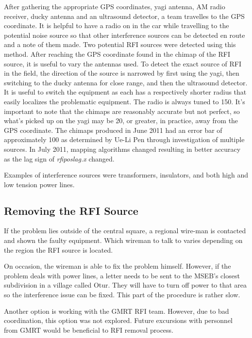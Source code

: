 \documentclass[a4paper,12pt]{article}
\begin{document}
      After gathering the appropriate GPS coordinates, yagi antenna, AM radio receiver, ducky antenna and an ultrasound detector, a  team travelles to the GPS coordinate. It is helpful to have a radio on in the car while travelling to the potential noise source so that other interference sources can be detected en route and a note of them made. Two potential RFI sources were detected using this method. After reaching the GPS coordinate found in the chimap of the RFI source, it is useful to vary the antennas used. To detect the exact source of RFI in the field, the direction of the source is narrowed by first using the yagi, then switching to the ducky antenna for close range, and then the ultrasound detector. It is useful to switch the equipment as each has a respectively shorter radius that easily localizes the problematic equipment. The radio is always tuned to \unit{150}{\mega\hertz}. It's important to note that the chimaps are reasonably accurate but not perfect, so what's picked up on the yagi may be \unit{20}{\metre}, or greater, in practice, away from the GPS coordinate. The chimaps produced in June 2011 had an error bar of approximately \unit{100}{\metre} as determined by Ue-Li Pen through investigation of multiple sources. In July 2011, mapping algorithms changed resulting in better accuracy as the lag sign of \emph{rfiposlag.x} changed.  

      Examples of interference sources were transformers, insulators, and both high and low tension power lines.

      \subsection{Removing the RFI Source}
      \label{sec:removingtherfisource}
      \label{sec:dealingwiththerfi}

      If the problem lies outside of the central square, a regional wire-man is contacted and shown the faulty equipment. Which wireman to talk to varies depending on the region the RFI source is located. 

      On occasion, the wireman is able to fix the problem himself. However, if the problem deals with power lines, a letter needs to be sent to the MSEB’s closest subdivision in a village called Otur. They will have to turn off power to that area so the interference issue can be fixed. This part of the procedure is rather slow.

      Another option is working with the GMRT RFI team. However, due to bad coordination, this option was not explored. Future excursions with personnel from GMRT would be beneficial to RFI removal process. 
\end{document}
